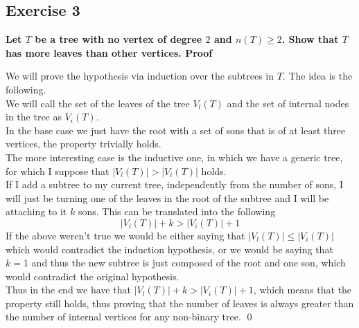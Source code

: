\subsection*{Exercise 3}
\boldmath 
\textbf{Let $T$ be a tree with no vertex of degree $2$ and $n(T) \geq 2$. Show that $T$ has more leaves than
other vertices. \spacer
Proof}
\unboldmath 

We will prove the hypothesis via induction over the subtrees in $T$. The idea is the following.\\ 
\linebreak 
We will call the set of the leaves of the tree $V_l(T)$ and the set of internal nodes in the tree as
$V_i(T)$.\\ 
\linebreak 
In the base case we just have the root with a set of sons that is of at least three vertices, the
property trivially holds.\\
\linebreak
The more interesting case is the inductive one, in which we have a generic tree, for which I suppose that $|V_l(T)| > |V_i(T)|$ holds.\\
If I add a subtree to my current tree, independently from the number of sons, I will just be turning one of the leaves in the root of the subtree and I will be attaching to it $k$ sons. This can be translated into the following
\begin{equation}
    |V_l(T)| + k > |V_i(T)| + 1
\end{equation}
If the above weren't true we would be either saying that $|V_l(T)| \leq |V_i(T)|$ which would contradict the induction hypothesis, or we would be saying that $k = 1$ and thus the new subtree is just composed of the root and one son, which would contradict the original hypothesis.\\
\linebreak 
Thus in the end we have that $|V_l(T)| + k > |V_i(T)| + 1$, which means that the property still holds, thus
proving that the number of leaves is always greater than the number of internal vertices for any non-binary tree. \qed

